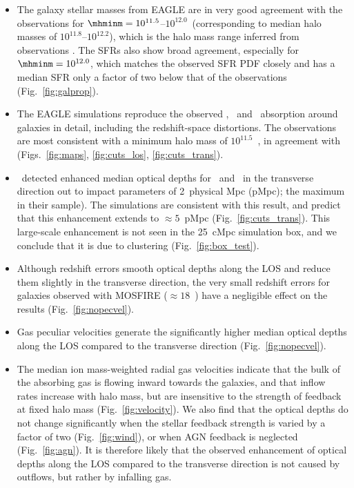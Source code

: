 \documentclass[useAMS,usenatbib,letterpaper]{mn2e}
\def\obspaper{\citetalias{turner14}}
\begin{document}
\begin{itemize}
  \item The galaxy stellar masses from EAGLE are in very good agreement with the 
  observations for $\mhminm=10^{11.5}$--$10^{12.0}$~\msol (corresponding to median halo
    masses of $10^{11.8}$--$10^{12.2}$), which is 
    the halo mass range inferred from observations \citep{trainor12, rakic13}. 
  The SFRs also show broad agreement, especially for 
   $\mhminm=10^{12.0}$, which matches the observed SFR PDF closely and 
  has a median SFR only a factor
  of two below that of the observations (Fig.~\ref{fig:galprop}).
  \item The EAGLE simulations reproduce the observed \hone, \cfour\ and
   \sifour\ absorption around galaxies in detail, including the redshift-space distortions.
  The observations are most consistent with a minimum halo mass of $10^{11.5}$~\msol, 
  in agreement with \citet{rakic13}
  (Figs.~\ref{fig:maps},  \ref{fig:cuts_los}, \ref{fig:cuts_trans}). 
  \item \obspaper\ detected enhanced median optical depths for
   \hone\ and \cfour\ in the transverse direction out to impact parameters of 
   2~physical Mpc (pMpc); the maximum in their sample). The simulations are consistent with this
   result, and predict that this enhancement extends 
   to $\approx5$~pMpc  (Fig.~\ref{fig:cuts_trans}). This large-scale enhancement 
    is not seen in the 25~cMpc simulation box, and we conclude that it is due to
     clustering (Fig.~\ref{fig:box_test}). 
  \item Although redshift errors smooth optical depths along the LOS 
    and reduce them slightly in the transverse direction, 
    the very small redshift errors for galaxies observed with 
    MOSFIRE ($\approx18$~\kmps) have a negligible  
   effect on the results (Fig.~\ref{fig:nopecvel}).
  \item Gas peculiar velocities generate the significantly higher
  median optical depths along the LOS compared to the transverse direction 
   (Fig.~\ref{fig:nopecvel}).
  \item The median ion mass-weighted radial gas velocities 
  indicate that the bulk of the absorbing gas is flowing inward towards the galaxies, 
  and that inflow rates increase with halo mass, but are insensitive to the 
  strength of feedback at fixed halo mass (Fig.~\ref{fig:velocity}).  
  We also find that the optical depths do not change significantly when the stellar
  feedback strength is varied by a factor of two (Fig.~\ref{fig:wind}), or when AGN feedback 
  is neglected (Fig.~\ref{fig:agn}). 
  It is therefore likely that the observed enhancement
   of optical depths along the LOS compared to the transverse direction is not caused by 
   outflows, but rather by infalling gas. 
\end{itemize}
\end{document}
